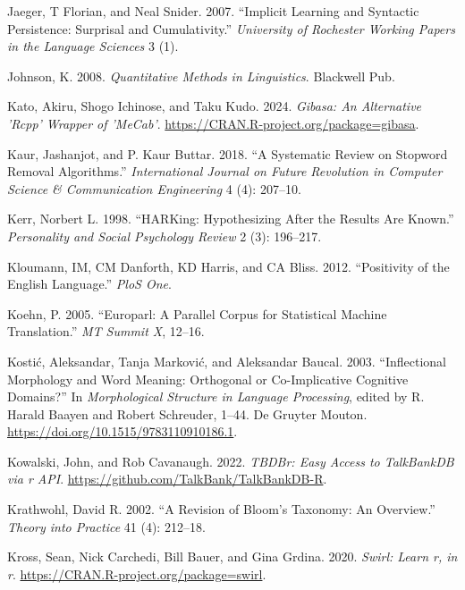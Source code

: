 \documentclass[
  letterpaper,
]{latex/krantz}
\newlength{\cslhangindent}
\newenvironment{CSLReferences}[2] %
 {\begin{list}{}{%
  \setlength{\itemindent}{0pt}
  \setlength{\leftmargin}{0pt}
  \setlength{\parsep}{0pt}
  \ifodd #1
   \setlength{\leftmargin}{\cslhangindent}
   \setlength{\itemindent}{-1\cslhangindent}
  \fi
  \setlength{\itemsep}{#2\baselineskip}}}
 {\end{list}}
\theoremstyle{definition}
\theoremstyle{remark}
\begin{document}
\begin{CSLReferences}{1}{0}
Jaeger, T Florian, and Neal Snider. 2007. {``Implicit Learning and
Syntactic Persistence: Surprisal and Cumulativity.''} \emph{University
of Rochester Working Papers in the Language Sciences} 3 (1).

Johnson, K. 2008. \emph{Quantitative Methods in Linguistics}. Blackwell
Pub.

Kato, Akiru, Shogo Ichinose, and Taku Kudo. 2024. \emph{Gibasa: An
Alternative 'Rcpp' Wrapper of 'MeCab'}.
\url{https://CRAN.R-project.org/package=gibasa}.

Kaur, Jashanjot, and P. Kaur Buttar. 2018. {``A Systematic Review on
Stopword Removal Algorithms.''} \emph{International Journal on Future
Revolution in Computer Science \& Communication Engineering} 4 (4):
207--10.

Kerr, Norbert L. 1998. {``HARKing: Hypothesizing After the Results Are
Known.''} \emph{Personality and Social Psychology Review} 2 (3):
196--217.

Kloumann, IM, CM Danforth, KD Harris, and CA Bliss. 2012. {``Positivity
of the English Language.''} \emph{PloS One}.

Koehn, P. 2005. {``Europarl: A Parallel Corpus for Statistical Machine
Translation.''} \emph{MT Summit X}, 12--16.

Kostić, Aleksandar, Tanja Marković, and Aleksandar Baucal. 2003.
{``Inflectional Morphology and Word Meaning: Orthogonal or
Co-Implicative Cognitive Domains?''} In \emph{Morphological Structure in
Language Processing}, edited by R. Harald Baayen and Robert Schreuder,
1--44. De Gruyter Mouton. \url{https://doi.org/10.1515/9783110910186.1}.

Kowalski, John, and Rob Cavanaugh. 2022. \emph{TBDBr: Easy Access to
TalkBankDB via r API}. \url{https://github.com/TalkBank/TalkBankDB-R}.

Krathwohl, David R. 2002. {``A Revision of Bloom's Taxonomy: An
Overview.''} \emph{Theory into Practice} 41 (4): 212--18.

Kross, Sean, Nick Carchedi, Bill Bauer, and Gina Grdina. 2020.
\emph{Swirl: Learn r, in r}.
\url{https://CRAN.R-project.org/package=swirl}.


\end{CSLReferences}
\end{document}
